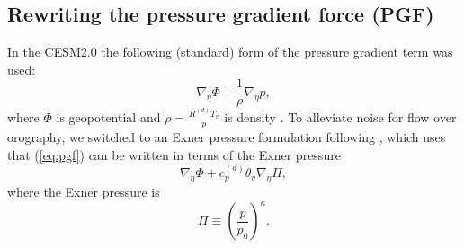 \documentclass[draft]{agujournal2019}
\begin{document}
\subsection{Rewriting the pressure gradient force (PGF)}
In the CESM2.0 the following (standard) form of the pressure gradient term was used:
\begin{equation}
\label{eq:pgf}
    \nabla_{\eta }\Phi+\frac{1}{\rho}\nabla_{\eta }p,
\end{equation}
where $\Phi$ is geopotential and $\rho=\frac{R^{(d)}T_v}{p}$ is density \cite<for details see >{LetAl2018JAMES}. To alleviate noise for flow over orography, 
 we switched to an Exner pressure formulation following , which uses that (\ref{eq:pgf}) can be written in terms of the Exner pressure
\begin{equation}\label{eq:pgf2}
    \nabla_{\eta }\Phi+c_p^{(d)}\theta_v\nabla_{\eta }\Pi,
\end{equation}
where the Exner pressure is
\begin{equation}
    \Pi\equiv \left( \frac{p}{p_0}\right)^{\kappa}.
\end{equation}
{}
\end{document}
